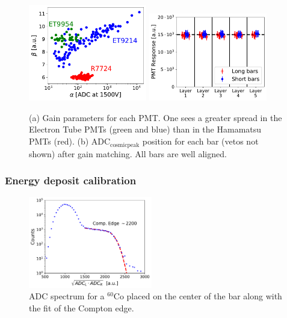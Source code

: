 \documentclass[3p,twocolumn]{elsarticle}
\begin{document}
\begin{figure}[tbh!]
	\centering
			\includegraphics[width=0.46\textwidth]{fig16a-gainspread.pdf}
			\subcaption{}
			\label{fig:gain}
			\includegraphics[width=0.46\textwidth]{fig16b-adcresponse.pdf}
			\subcaption{}
		\label{fig:hv_settings}
		\caption{ (a) Gain parameters for each PMT. One sees a greater spread in the Electron Tube PMTs (green and blue) than in the Hamamatsu PMTs (red). (b) $\mathrm{ADC}_{\mathrm{cosmic peak}}$ position for each bar (vetos not shown) after gain matching. All bars are well aligned.}
\end{figure}

\subsubsection{Energy deposit calibration}
\label{sec:energydeposit}
\begin{figure}[tbh!]
	\centering
		\includegraphics[width=0.48\textwidth]{fig17-cobaltfit.pdf}
		\caption{ADC spectrum for a $^{60}$Co placed on the center of the bar along with the fit of the Compton edge.}
	\label{fig:compton_edge}
\end{figure}
\end{document}
